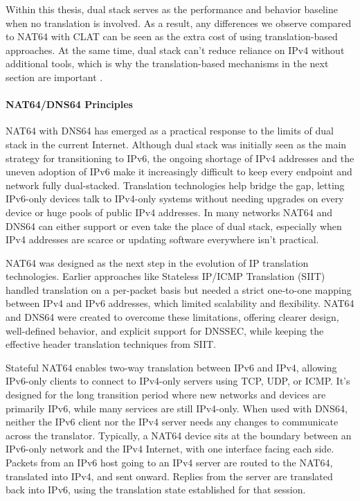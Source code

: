 Within this thesis, dual stack serves as the performance and behavior baseline when no translation is involved. As a result, any differences we observe compared to NAT64 with CLAT can be seen as the extra cost of using translation-based approaches. At the same time, dual stack can’t reduce reliance on IPv4 without additional tools, which is why the translation-based mechanisms in the next section are important \cite{punithavathani2009ipv4,LEVIN20141059}.

\paragraph{NAT64/DNS64 Principles} 


NAT64 with DNS64 has emerged as a practical response to the limits of dual stack in the current Internet\cite{rfc7269}. Although dual stack was initially seen as the main strategy for transitioning to IPv6, the ongoing shortage of IPv4 addresses and the uneven adoption of IPv6 make it increasingly difficult to keep every endpoint and network fully dual-stacked\cite{rfc7269}. Translation technologies help bridge the gap, letting IPv6-only devices talk to IPv4-only systems without needing upgrades on every device or huge pools of public IPv4 addresses. In many networks NAT64 and DNS64 can either support or even take the place of dual stack, especially when IPv4 addresses are scarce or updating software everywhere isn’t practical\cite{6231295}.

NAT64 was designed as the next step in the evolution of IP translation technologies. Earlier approaches like Stateless IP/ICMP Translation (SIIT) handled translation on a per-packet basis but needed a strict one-to-one mapping between IPv4 and IPv6 addresses, which limited scalability and flexibility\cite{rfc6146}. NAT64 and DNS64 were created to overcome these limitations, offering clearer design, well-defined behavior, and explicit support for DNSSEC, while keeping the effective header translation techniques from SIIT\cite{6231295}.

Stateful NAT64 enables two-way translation between IPv6 and IPv4, allowing IPv6-only clients to connect to IPv4-only servers using TCP, UDP, or ICMP. It's designed for the long transition period where new networks and devices are primarily IPv6, while many services are still IPv4-only. When used with DNS64, neither the IPv6 client nor the IPv4 server needs any changes to communicate across the translator. Typically, a NAT64 device sits at the boundary between an IPv6-only network and the IPv4 Internet, with one interface facing each side. Packets from an IPv6 host going to an IPv4 server are routed to the NAT64, translated into IPv4, and sent onward. Replies from the server are translated back into IPv6, using the translation state established for that session\cite{rfc6146}.

